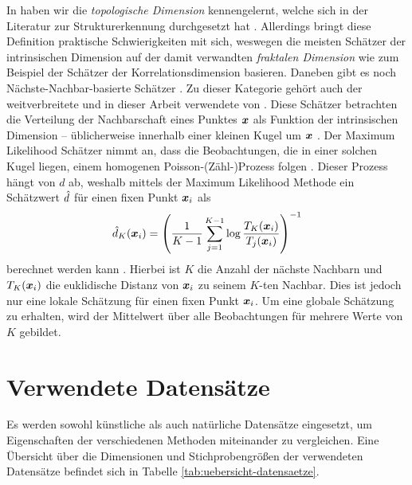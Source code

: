 In  haben wir die \textit{topologische
	Dimension} kennengelernt, welche sich in der Literatur zur Strukturerkennung durchgesetzt hat \parencite[1]{Campadelli.2015}. Allerdings bringt diese Definition praktische Schwierigkeiten mit sich,
weswegen die meisten Schätzer der intrinsischen Dimension auf der damit verwandten
\textit{fraktalen Dimension} wie zum Beispiel der Schätzer der Korrelationsdimension \parencite{Camastra.2002} basieren. Daneben gibt es noch Nächste-Nachbar-basierte Schätzer \parencite[1]{Campadelli.2015}. Zu dieser Kategorie gehört auch der weitverbreitete und in dieser
Arbeit verwendete  von \textcite{Levina.2004}. Diese Schätzer
betrachten die Verteilung der Nachbarschaft eines Punktes $\bm{x}$ als Funktion der
intrinsischen Dimension -- üblicherweise innerhalb einer kleinen Kugel um $\bm{x}$
\parencite[8]{Campadelli.2015}. Der Maximum Likelihood Schätzer nimmt an, dass die Beobachtungen, die
in einer solchen Kugel liegen, einem homogenen Poisson-(Zähl-)Prozess folgen
\parencite[2]{Levina.2004}. Dieser Prozess hängt von $d$ ab, weshalb mittels der Maximum Likelihood
Methode ein Schätzwert $\hat{d}$ für einen fixen Punkt $\bm{x}_i$ als
\begin{equation}
	\hat{d}_K(\bm{x}_i) = \left( \frac{1}{K - 1} \sum_{j=1}^{K - 1} \log \frac{T_K(\bm{x}_i)}{T_j(\bm{x}_i)} \right)^{-1}
\end{equation}
berechnet werden kann \parencite[4]{Levina.2004}. Hierbei ist $K$ die Anzahl der nächste Nachbarn und $T_{K}(\bm{x}_i)$ die
euklidische Distanz von $\bm{x}_i$ zu seinem $K$-ten Nachbar. Dies ist jedoch nur eine lokale
Schätzung für einen fixen Punkt $\bm{x}_i$. Um eine globale Schätzung zu erhalten, wird der
Mittelwert über alle Beobachtungen für mehrere Werte von $K$ gebildet.
\section{Verwendete Datensätze}
\label{ch:Vergleich:sec:VerwendeteDatensaetze}
Es werden sowohl künstliche als auch natürliche Datensätze eingesetzt, um Eigenschaften der
verschiedenen Methoden miteinander zu vergleichen. Eine Übersicht über die Dimensionen und Stichprobengrößen der verwendeten Datensätze befindet sich in Tabelle \ref{tab:uebersicht-datensaetze}.

